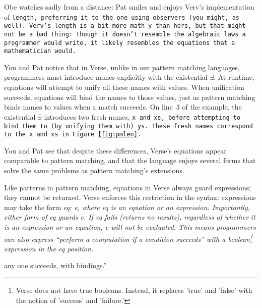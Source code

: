 \documentclass[manuscript,screen,review, 12pt]{acmart}
\begin{document}
    Obe watches sadly from a distance: Pat smiles and enjoys Verv's
    implementation of \tt{length}, preferring it to the one using observers (you
    might, as well). Verv's \tt{length} is a bit more math-y than hers, but that
    might not be a bad thing: though it doesn't resemble the algebraic laws a
    programmer would write, it likely resembles the equations that a
    mathematician would. 

    
    
    
    You and Pat notice that in Verse, unlike in our pattern matching languages,
    programmers must introduce names explicitly with the existential $\exists$.
    At runtime, equations will attempt to unify all these names with values.
    When unification succeeds, equations will bind the names to those values,
    just as pattern matching binds names to values when a match succeeds. On
    line~3 of the example, the existential $\exists$ introduces two fresh names,
    \tt{x} and \tt{xs}, before attempting to bind them to (by unifying them
    with) \tt{ys}. These fresh names correspond to the \tt{x} and \tt{xs} in
    Figure \ref{fig:pmlen}. 

    You and Pat see that despite these differences, Verse's equations appear
    comparable to pattern matching, and that the language enjoys several forms
    that solve the same problems as pattern matching's extensions. 

    

    Like patterns in pattern matching, equations in Verse always guard
    expressions; they cannot be returned. Verse enforces this restriction in the
    syntax: expressions may take the form \it{eq; e}, where \it{eq} is an
    equation or an expression. Importantly, either form of \it{eq} guards {e}.
    If \it{eq} fails (returns no results), regardless of whether it is an
    expression or an equation, \it{e} will not be evaluated. This means
    programmers can also express “perform a computation if a condition succeeds”
    with a boolean\footnote{Verse does not have true booleans. Instead, it
    replaces 'true' and 'false' with the notion of 'success' and 'failure.'}
    expression in the \it{eq} position. 

    

    

    
    any one succeeds, with bindings.” 


\end{document}
